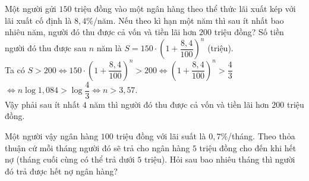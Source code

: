 \begin{ex}%
Một người gửi $150$ triệu đồng vào một ngân hàng theo thể thức lãi xuất kép với lãi xuất cố định là $8,4\%$/năm. Nếu theo kì hạn một năm thì sau ít nhất bao nhiêu năm, người đó thu được cả vốn và tiền lãi hơn $200$ triệu đồng?
\loigiai
{
Số tiền người đó thu được sau $n$ năm là $S=150\cdot{\left(1+\dfrac{8,4}{100}\right)^n}$ (triệu).\\
Ta có $S>200\Leftrightarrow 150 \cdot{\left(1+\dfrac{8,4}{100}\right)^n}>200 \Leftrightarrow{\left(1+\dfrac{8,4}{100}\right)^n}>\dfrac{4}{3}$ \\
$\Leftrightarrow n\log 1,084>\log \dfrac{4}{3}\Leftrightarrow n>3,57$.\\
Vậy phải sau ít nhất $4$ năm thì người đó thu được cả vốn và tiền lãi hơn $200$ triệu đồng.
}
\end{ex}

\begin{bt}%
	Một người vậy ngân hàng $100$ triệu đồng với lãi suất là $0{,}7\%$/tháng. Theo thỏa thuận cứ mỗi tháng người đó sẽ trả cho ngân hàng $5$ triệu đồng cho đến khi hết nợ (tháng cuối cùng có thể trả dưới $5$ triệu). Hỏi sau bao nhiêu tháng thì người đó trả được hết nợ ngân hàng?
	\par{}
\end{bt}

